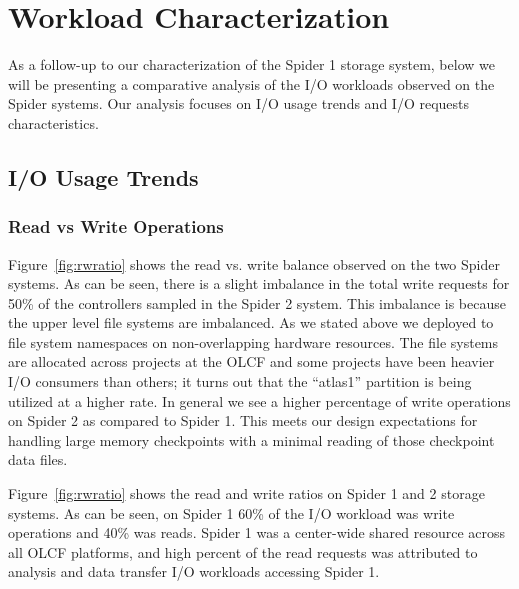 \section{Workload Characterization}
\label{sec:workloadchar}

As a follow-up to our characterization of the Spider 1 storage system, below we
will be presenting a comparative analysis of the I/O workloads observed on the
Spider systems. Our analysis focuses on I/O usage trends and I/O requests
characteristics.


\subsection{I/O Usage Trends}

\subsubsection{Read vs Write Operations}


Figure~\ref{fig:rwratio} shows the read vs. write balance observed on the two
Spider systems.  As can be seen, there is a slight imbalance in the total write
requests for 50\% of the controllers sampled in the Spider 2 system. This
imbalance is because the upper level file systems are imbalanced. As we stated
above we deployed to file system namespaces on  non-overlapping hardware
resources. The file systems are allocated across projects at the OLCF and some
projects have been heavier I/O consumers than others; it turns out that the
``atlas1'' partition is being utilized at a higher rate.  In general we see a
higher percentage of write operations on Spider 2 as compared to Spider 1. This
meets our design expectations for handling large memory checkpoints with a
minimal reading of those checkpoint data files.


Figure~\ref{fig:rwratio} shows the read and write ratios on Spider 1 and 2
storage systems. As can be seen, on Spider 1 60\% of the I/O workload was write
operations and 40\% was reads. Spider 1 was a center-wide shared resource
across all OLCF platforms, and high percent of the read requests was attributed
to analysis and data transfer I/O workloads accessing Spider 1. 

